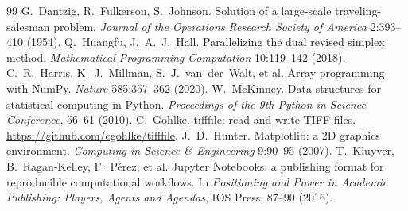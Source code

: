 \documentclass[11pt,a4paper]{article}
\begin{document}
\begin{thebibliography}{99}
 G.~Dantzig, R.~Fulkerson, S.~Johnson. Solution of a large-scale traveling-salesman problem. \emph{Journal of the Operations Research Society of America} 2:393--410 (1954).
 Q.~Huangfu, J.~A.~J.~Hall. Parallelizing the dual revised simplex method. \emph{Mathematical Programming Computation} 10:119--142 (2018).
 C.~R.~Harris, K.~J.~Millman, S.~J.~van~der~Walt, et al. Array programming with NumPy. \emph{Nature} 585:357--362 (2020).
 W.~McKinney. Data structures for statistical computing in Python. \emph{Proceedings of the 9th Python in Science Conference}, 56--61 (2010).
 C.~Gohlke. tifffile: read and write TIFF files. \url{https://github.com/cgohlke/tifffile}.
 J.~D.~Hunter. Matplotlib: a 2D graphics environment. \emph{Computing in Science \& Engineering} 9:90--95 (2007).
 T.~Kluyver, B.~Ragan-Kelley, F.~P\'erez, et al. Jupyter Notebooks: a publishing format for reproducible computational workflows. In \emph{Positioning and Power in Academic Publishing: Players, Agents and Agendas}, IOS Press, 87--90 (2016).
\end{thebibliography}
\end{document}
